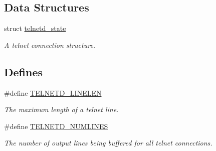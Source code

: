 \subsection*{Data Structures}
\begin{CompactItemize}
\item 
struct \hyperlink{a00027}{telnetd\_\-state}
\begin{CompactList}\small\item\em A telnet connection structure. \item\end{CompactList}\end{CompactItemize}
\subsection*{Defines}
\begin{CompactItemize}
\item 
\hypertarget{a00081_g7764fc5e71ca9e338a6a66da54d3b308}{
\#define \hyperlink{a00081_g7764fc5e71ca9e338a6a66da54d3b308}{TELNETD\_\-LINELEN}}
\label{a00081_g7764fc5e71ca9e338a6a66da54d3b308}

\begin{CompactList}\small\item\em The maximum length of a telnet line. \item\end{CompactList}\item 
\hypertarget{a00081_gd20b6d3f9a5b992bc2de6429b37169ca}{
\#define \hyperlink{a00081_gd20b6d3f9a5b992bc2de6429b37169ca}{TELNETD\_\-NUMLINES}}
\label{a00081_gd20b6d3f9a5b992bc2de6429b37169ca}

\begin{CompactList}\small\item\em The number of output lines being buffered for all telnet connections. \item\end{CompactList}\end{CompactItemize}

